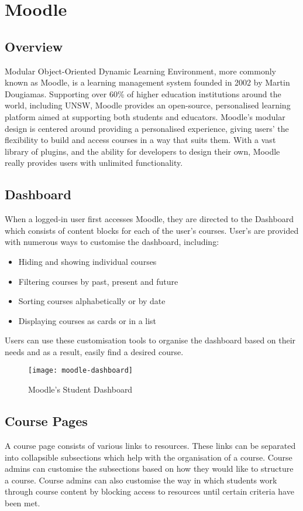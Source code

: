 \section{Moodle}
\subsection{Overview}
Modular Object-Oriented Dynamic Learning Environment, more commonly known as Moodle, is a learning management system founded in 2002 by Martin Dougiamas.
Supporting over 60\% of higher education institutions around the world, including UNSW, Moodle provides an open-source, personalised learning platform aimed at supporting both students and educators.
Moodle's modular design is centered around providing a personalised experience, giving users' the flexibility to build and access courses in a way that suits them.
With a vast library of plugins, and the ability for developers to design their own, Moodle really provides users with unlimited functionality.

\subsection{Dashboard}
When a logged-in user first accesses Moodle, they are directed to the Dashboard which consists of content blocks for each of the user's courses.
User's are provided with numerous ways to customise the dashboard, including:

\begin{itemize}
    \item Hiding and showing individual courses
    \item Filtering courses by past, present and future
    \item Sorting courses alphabetically or by date
    \item Displaying courses as cards or in a list
\end{itemize}

Users can use these customisation tools to organise the dashboard based on their needs and as a result, easily find a desired course.

\begin{figure}[h!]
    \centering
    \texttt{[image: moodle-dashboard]}
    \caption{Moodle's Student Dashboard}
\end{figure}

\newpage

\subsection{Course Pages}
A course page consists of various links to resources. These links can be separated into collapsible subsections which help with the organisation of a course.
Course admins can customise the subsections based on how they would like to structure a course.
Course admins can also customise the way in which students work through course content by blocking access to resources until certain criteria have been met.

